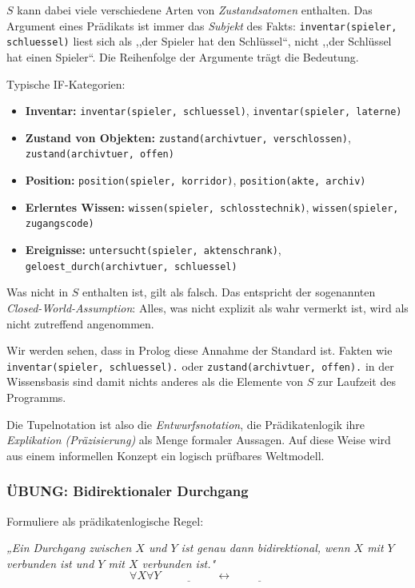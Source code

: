 \documentclass[parskip=half,a4paper,11pt]{scrreprt}
\begin{document}
$S$ kann dabei viele verschiedene Arten von \textit{Zustandsatomen} enthalten. Das Argument eines Prädikats ist immer das \textit{Subjekt} des Fakts: \texttt{inventar(spieler, schluessel)} liest sich als ,,der Spieler hat den Schlüssel``, nicht ,,der Schlüssel hat einen Spieler``. Die Reihenfolge der Argumente trägt die Bedeutung.

Typische IF-Kategorien:

\begin{itemize}
    \item \textbf{Inventar:} \texttt{inventar(spieler, schluessel)}, \texttt{inventar(spieler, laterne)}
    \item \textbf{Zustand von Objekten:} \texttt{zustand(archivtuer, verschlossen)}, \texttt{zustand(archivtuer, offen)}
    \item \textbf{Position:} \texttt{position(spieler, korridor)}, \texttt{position(akte, archiv)}
    \item \textbf{Erlerntes Wissen:} \texttt{wissen(spieler, schlosstechnik)}, \texttt{wissen(spieler, zugangscode)}
    \item \textbf{Ereignisse:} \texttt{untersucht(spieler, aktenschrank)}, \texttt{geloest\_durch(archivtuer, schluessel)}
\end{itemize}

Was nicht in $S$ enthalten ist, gilt als falsch. Das entspricht der sogenannten \textit{Closed-World-Assumption}: Alles, was nicht explizit als wahr vermerkt ist, wird als nicht zutreffend angenommen.

Wir werden sehen, dass in Prolog diese Annahme der Standard ist. Fakten wie \texttt{inventar(spieler, schluessel).} oder \texttt{zustand(archivtuer, offen).} in der Wissensbasis sind damit nichts anderes als die Elemente von $S$ zur Laufzeit des Programms.

Die Tupelnotation ist also die \textit{Entwurfsnotation}, die Prädikatenlogik ihre \textit{Explikation (Präzisierung)} als Menge formaler Aussagen. Auf diese Weise wird aus einem informellen Konzept ein logisch prüfbares Weltmodell.

\subsubsection{ÜBUNG: Bidirektionaler Durchgang}

Formuliere als prädikatenlogische Regel:

\textit{„Ein Durchgang zwischen $X$ und $Y$ ist genau dann bidirektional, wenn $X$ mit $Y$ verbunden ist und $Y$ mit $X$ verbunden ist."}
$$\forall X \forall Y\, \underline{\hspace{2cm}} \leftrightarrow \underline{\hspace{2cm}}$$
\end{document}

